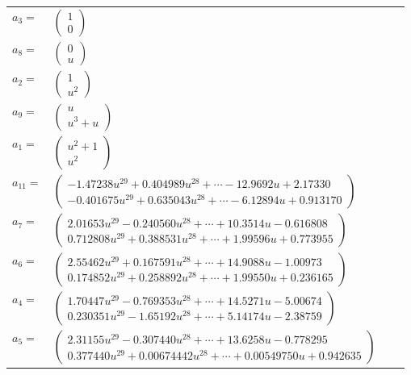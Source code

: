 \documentclass[1p]{elsarticle_modified}
\theoremstyle{definition}
\begin{document}
\begin{tabular}{m{7pt} m{180pt} m{7pt} m{180pt} }
\flushright $a_{3}=$&$\begin{pmatrix}1\\0\end{pmatrix}$ \\
\flushright $a_{8}=$&$\begin{pmatrix}0\\u\end{pmatrix}$ \\
\flushright $a_{2}=$&$\begin{pmatrix}1\\u^2\end{pmatrix}$ \\
\flushright $a_{9}=$&$\begin{pmatrix}u\\u^3+u\end{pmatrix}$ \\
\flushright $a_{1}=$&$\begin{pmatrix}u^2+1\\u^2\end{pmatrix}$ \\
\flushright $a_{11}=$&$\begin{pmatrix}-1.47238 u^{29}+0.404989 u^{28}+\cdots-12.9692 u+2.17330\\-0.401675 u^{29}+0.635043 u^{28}+\cdots-6.12894 u+0.913170\end{pmatrix}$ \\
\flushright $a_{7}=$&$\begin{pmatrix}2.01653 u^{29}-0.240560 u^{28}+\cdots+10.3514 u-0.616808\\0.712808 u^{29}+0.388531 u^{28}+\cdots+1.99596 u+0.773955\end{pmatrix}$ \\
\flushright $a_{6}=$&$\begin{pmatrix}2.55462 u^{29}+0.167591 u^{28}+\cdots+14.9088 u-1.00973\\0.174852 u^{29}+0.258892 u^{28}+\cdots+1.99550 u+0.236165\end{pmatrix}$ \\
\flushright $a_{4}=$&$\begin{pmatrix}1.70447 u^{29}-0.769353 u^{28}+\cdots+14.5271 u-5.00674\\0.230351 u^{29}-1.65192 u^{28}+\cdots+5.14174 u-2.38759\end{pmatrix}$ \\
\flushright $a_{5}=$&$\begin{pmatrix}2.31155 u^{29}-0.307440 u^{28}+\cdots+13.6258 u-0.778295\\0.377440 u^{29}+0.00674442 u^{28}+\cdots+0.00549750 u+0.942635\end{pmatrix}$ \\

\end{tabular}
\end{document}
